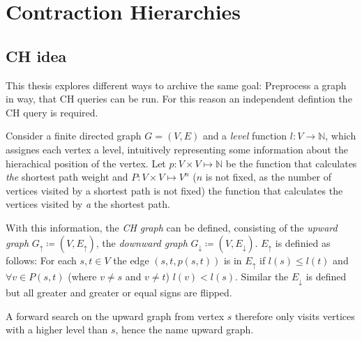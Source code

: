 \section{Contraction Hierarchies}

\subsection{CH idea}
This thesis explores different ways to archive the same goal: Preprocess a graph in way, that CH queries can be run. For this reason an independent defintion the CH query is required.

Consider a finite directed graph $G = (V, E)$ and a \emph{level} function $l \colon V \to \mathbb{N}$, which assignes each vertex a level, intuitively representing some information about the hierachical position of the vertex.
Let $p \colon V \times V \mapsto \mathbb{N}$ be the function that calculates \emph{the} shortest path weight and $P \colon V \times V \mapsto V^{n}$ ($n$ is not fixed, as the number of vertices visited by a shortest path is not fixed) the function that calculates the vertices visited by \emph{a} the shortest path.

With this information, the \emph{CH graph} can be defined, consisting of the \emph{upward graph} $G_{\uparrow} \coloneqq (V, E_{\uparrow})$, the \emph{downward graph} $G_{\downarrow} \coloneqq (V, E_{\downarrow})$.
$E_{\uparrow}$ is definied as follows: For each $s, t \in V$ the edge $(s, t, p(s, t))$ is in $E_{\uparrow}$ if $l(s) \leq l(t)$ and $\forall v \in P(s, t)$ (where $v \neq s$ and $v \neq t$) $l(v) < l(s)$.
Similar the $E_{\downarrow}$ is defined but all greater and greater or equal signs are flipped.

A forward search on the upward graph from vertex $s$ therefore only visits vertices with a higher level than $s$, hence the name upward graph.
